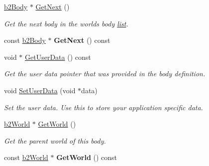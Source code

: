 \begin{DoxyCompactItemize}
\item 
\mbox{\label{classb2Body_ad54182a11d02362b027a0eb072775bdc}} 
\hyperlink{classb2Body}{b2\+Body} $\ast$ \hyperlink{classb2Body_ad54182a11d02362b027a0eb072775bdc}{Get\+Next} ()
\begin{DoxyCompactList}\small\item\em Get the next body in the world\textquotesingle{}s body \hyperlink{protocollist-p}{list}. \end{DoxyCompactList}\item 
\mbox{\label{classb2Body_aa118d06e0ae6444c02bb5d22bb448269}} 
const \hyperlink{classb2Body}{b2\+Body} $\ast$ {\bfseries Get\+Next} () const
\item 
\mbox{\label{classb2Body_a672c782f7184faf3d673b08681dd63e3}} 
void $\ast$ \hyperlink{classb2Body_a672c782f7184faf3d673b08681dd63e3}{Get\+User\+Data} () const
\begin{DoxyCompactList}\small\item\em Get the user data pointer that was provided in the body definition. \end{DoxyCompactList}\item 
\mbox{\label{classb2Body_a5553a5ecdfd2d7200ba2405ce6043f52}} 
void \hyperlink{classb2Body_a5553a5ecdfd2d7200ba2405ce6043f52}{Set\+User\+Data} (void $\ast$data)
\begin{DoxyCompactList}\small\item\em Set the user data. Use this to store your application specific data. \end{DoxyCompactList}\item 
\mbox{\label{classb2Body_abfd9466763b20977f9122d0e162dfeb9}} 
\hyperlink{classb2World}{b2\+World} $\ast$ \hyperlink{classb2Body_abfd9466763b20977f9122d0e162dfeb9}{Get\+World} ()
\begin{DoxyCompactList}\small\item\em Get the parent world of this body. \end{DoxyCompactList}\item 
\mbox{\label{classb2Body_a7e0fc2b91fbfc11da467700fd0792088}} 
const \hyperlink{classb2World}{b2\+World} $\ast$ {\bfseries Get\+World} () const
\item 

\end{DoxyCompactItemize}
